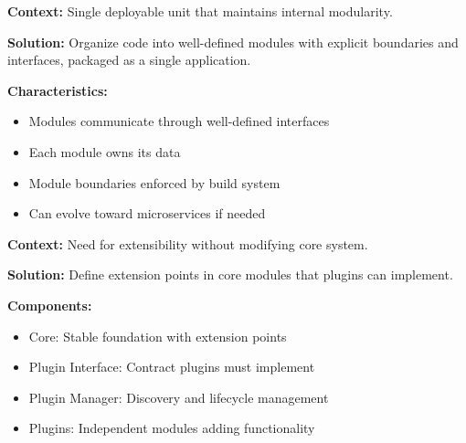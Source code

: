 \documentclass[11pt,letterpaper]{article}
\begin{document}
\begin{patternbox}
\textbf{Context:} Single deployable unit that maintains internal modularity.

\textbf{Solution:} Organize code into well-defined modules with explicit boundaries and interfaces, packaged as a single application.

\textbf{Characteristics:}
\begin{itemize}[nosep]
    \item Modules communicate through well-defined interfaces
    \item Each module owns its data
    \item Module boundaries enforced by build system
    \item Can evolve toward microservices if needed
\end{itemize}
\end{patternbox}

\begin{patternbox}
\textbf{Context:} Need for extensibility without modifying core system.

\textbf{Solution:} Define extension points in core modules that plugins can implement.

\textbf{Components:}
\begin{itemize}[nosep]
    \item Core: Stable foundation with extension points
    \item Plugin Interface: Contract plugins must implement
    \item Plugin Manager: Discovery and lifecycle management
    \item Plugins: Independent modules adding functionality
\end{itemize}
\end{patternbox}
\end{document}
